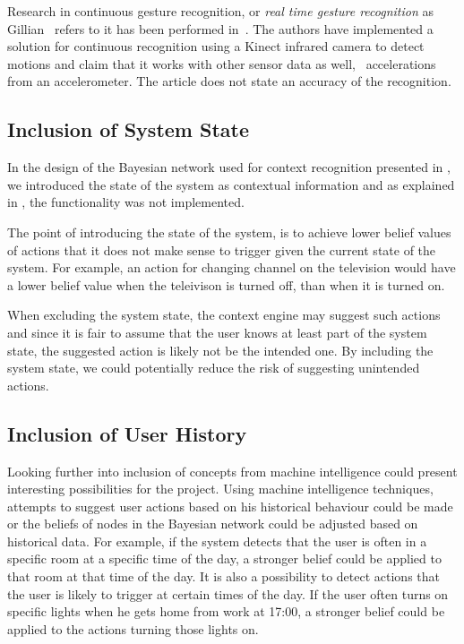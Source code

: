 Research in continuous gesture recognition, or \emph{real time gesture recognition} as Gillian \etal~refers to it has been performed in~\cite{gillian2014gesture}. The authors have implemented a solution for continuous recognition using a Kinect infrared camera to detect motions and claim that it works with other sensor data as well, \eg~accelerations from an accelerometer. The article does not state an accuracy of the recognition.

\subsection{Inclusion of System State}

In the design of the Bayesian network used for context recognition presented in , we introduced the state of the system as contextual information and as explained in , the functionality was not implemented.

The point of introducing the state of the system, is to achieve lower belief values of actions that it does not make sense to trigger given the current state of the system. For example, an action for changing channel on the television would have a lower belief value when the teleivison is turned off, than when it is turned on. 

When excluding the system state, the context engine may suggest such actions and since it is fair to assume that the user knows at least part of the system state, the suggested action is likely not be the intended one. By including the system state, we could potentially reduce the risk of suggesting unintended actions.

\subsection{Inclusion of User History}

Looking further into inclusion of concepts from machine intelligence could present interesting possibilities for the project. Using machine intelligence techniques, attempts to suggest user actions based on his historical behaviour could be made or the beliefs of nodes in the Bayesian network could be adjusted based on historical data. For example, if the system detects that the user is often in a specific room at a specific time of the day, a stronger belief could be applied to that room at that time of the day. It is also a possibility to detect actions that the user is likely to trigger at certain times of the day. If the user often turns on specific lights when he gets home from work at 17:00, a stronger belief could be applied to the actions turning those lights on.

